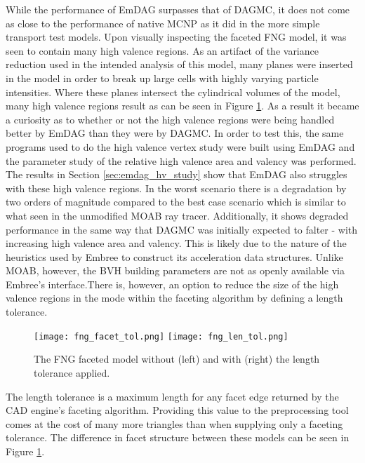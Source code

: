 While the performance of EmDAG surpasses that of DAGMC, it does not come
as close to the performance of native MCNP as it did in the more simple
transport test models. Upon visually inspecting the faceted FNG model, it was
seen to contain many high valence regions. As an artifact of the variance
reduction used in the intended analysis of this model, many planes were inserted
in the model in order to break up large cells with highly varying particle
intensities. Where these planes intersect the cylindrical volumes of the model,
many high valence regions result as can be seen in Figure
\ref{fng-faceted-models}. As a result it became a curiosity as to whether or
not the high valence regions were being handled better by EmDAG than they were
by DAGMC. In order to test this, the same programs used to do the high valence
vertex study were built using EmDAG and the parameter study of the relative high
valence area and valency was performed. The results in Section \ref{sec:emdag_hv_study}
show that EmDAG also struggles with these high valence regions. In the worst
scenario there is a degradation by two orders of magnitude compared to the best
case scenario which is similar to what seen in the unmodified MOAB ray
tracer. Additionally, it shows degraded performance in the same way that DAGMC
was initially expected to falter - with increasing high valence area and
valency. This is likely due to the nature of the heuristics used by Embree to
construct its acceleration data structures.  Unlike MOAB, however, the BVH
building parameters are not as openly available via Embree's interface.There is,
however, an option to reduce the size of the high valence regions in the mode
within the faceting algorithm by defining a length tolerance.

\begin{figure}[H]
  \small
  \begin{center}
    \texttt{[image: fng\_facet\_tol.png]}
    \texttt{[image: fng\_len\_tol.png]}
    \caption{The FNG faceted model without (left) and with (right) the length
      tolerance applied.}
    \label{fng-faceted-models}
  \end{center}
\end{figure}

The length tolerance is a maximum length for any facet edge returned by the CAD
engine's faceting algorithm. Providing this value to the preprocessing tool
comes at the cost of many more triangles than when supplying only a faceting
tolerance. The difference in facet structure between these models can be seen in
Figure \ref{fng-faceted-models}.

